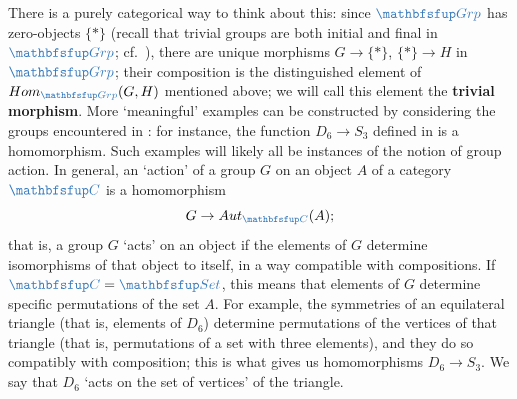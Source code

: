 There is a purely categorical way to think about this: since
$\categ{Grp}$ has zero-objects $\{*\}$ (recall that trivial groups are
both initial and final in $\categ{Grp}$; cf.\
), there are unique morphisms
$G \to \{*\}$, $\{*\} \to H$ in $\categ{Grp}$; their composition is
the distinguished element of $\Hom_{\categ{Grp}}(G,H)$ mentioned
above; we will call this element the \textbf{trivial morphism}.  More
`meaningful' examples can be constructed by considering the groups
encountered in \Cref{sec:groups:examples-of-groups}: for instance,
the function $D_6 \to S_3$ defined in
 is a homomorphism. Such
examples will likely all be instances of the notion of group
action. In general, an `action' of a group $G$ on an object $A$ of a
category $\categ{C}$ is a homomorphism
\[
  G \to \Aut_{\categ{C}}(A);
\]
that is, a group $G$ `acts' on an object if the elements of $G$
determine isomorphisms of that object to itself, in a way compatible
with compositions.  If $\categ{C} = \categ{Set}$, this means that
elements of $G$ determine specific permutations of the set $A$. For
example, the symmetries of an equilateral triangle (that is, elements
of $D_6$) determine permutations of the vertices of that triangle
(that is, permutations of a set with three elements), and they do so
compatibly with composition; this is what gives us homomorphisms
$D_6 \to S_3$. We say that $D_6$ `acts on the set of vertices' of the
triangle.

